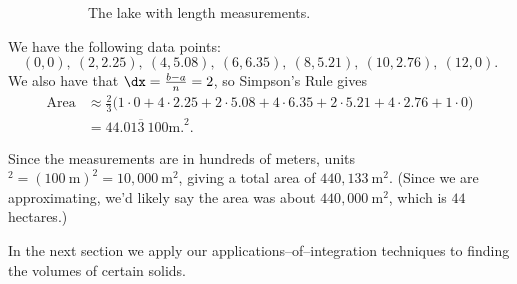 \begin{solution}
{\begin{figure}[H]
\begin{subfigure}[t]{0.5\textwidth}
        \label{fig:abc5b}
        \caption{The lake with length measurements.}    
    \end{subfigure} 
    \caption{\label{fig:abc5}}
\end{figure}



We have the following data points:
$$(0,0),\ (2,2.25),\ (4,5.08),\ (6,6.35),\ (8,5.21),\ (10,2.76),\ (12,0).$$
We also have that $\dx=\frac{b-a}{n} = 2$, so Simpson's Rule gives
\begin{align*}
\text{Area}&\approx \frac{2}{3}\Big(1\cdot0+4\cdot2.25+2\cdot5.08+4\cdot6.35+2\cdot5.21+4\cdot2.76+1\cdot0\Big)\\
			&= 44.01\overline{3} \ \text{100m.}^2.
\end{align*}

Since the measurements are in hundreds of meters, units$^2 = (100\ \text{m})^2 = 10,000\ \text{m}^2$, giving a total area of $440,133\ \text{m}^2$. (Since we are approximating, we'd likely say the area was about $440,000\ \text{m}^2$, which is   $ 44 $ hectares.)
}
\end{solution}




In the next section we apply our applications--of--integration techniques to finding the volumes of certain solids.
































